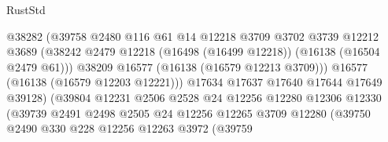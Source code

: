 \begin{lexlean}{RustStd}
\begin{coremodule}
                                        @38282
                                        (@39758
                                          @2480
                                          @116
                                          @61
                                          @14
                                          @12218
                                          @3709
                                          @3702
                                          @3739
                                          @12212
                                          @3689
                                          (@38242
                                            @2479
                                            @12218
                                            (@16498 (@16499 @12218))
                                            (@16138 (@16504 @2479 @61)))
                                          @38209
                                          @16577
                                          (@16138 (@16579 @12213 @3709)))
                                        @16577
                                        (@16138 (@16579 @12203 @12221)))
                                      @17634
                                      @17637
                                      @17640
                                      @17644
                                      @17649
                                      @39128)
                                    (@39804
                                      @12231
                                      @2506
                                      @2528
                                      @24
                                      @12256
                                      @12280
                                      @12306
                                      @12330
                                      (@39739
                                        @2491
                                        @2498
                                        @2505
                                        @24
                                        @12256
                                        @12265
                                        @3709
                                        @12280
                                        (@39750
                                          @2490
                                          @330
                                          @228
                                          @12256
                                          @12263
                                          @3972
                                          (@39759

\end{coremodule}
\end{lexlean}
